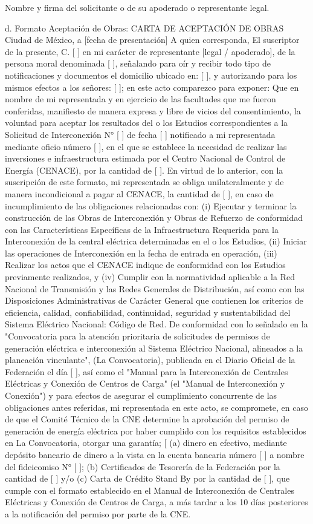  
Nombre y firma del solicitante o de su apoderado o representante legal.\par
d. Formato Aceptación de Obras:
CARTA DE ACEPTACIÓN DE OBRAS
Ciudad de México, a [fecha de presentación]
A quien corresponda,
El suscriptor de la presente, C. [   ] en mi carácter de representante [legal / apoderado], de la persona moral denominada [   ], señalando para oír y recibir todo tipo de notificaciones y documentos el domicilio ubicado en: [   ], y autorizando para los mismos efectos a los señores: [   ]; en este acto comparezco para exponer:
Que en nombre de mi representada y en ejercicio de las facultades que me fueron conferidas, manifiesto de manera expresa y libre de vicios del consentimiento, la voluntad para aceptar los resultados del o los Estudios correspondientes a la Solicitud de Interconexión N° [  ] de fecha [ ] notificado a mi representada mediante oficio número [   ], en el que se establece la necesidad de realizar las inversiones e infraestructura estimada por el Centro Nacional de Control de Energía (CENACE), por la cantidad de [   ].
En virtud de lo anterior, con la suscripción de este formato, mi representada se obliga unilateralmente y de manera incondicional a pagar al CENACE, la cantidad de [  ], en caso de incumplimiento de las obligaciones relacionadas con: (i) Ejecutar y terminar la construcción de las Obras de Interconexión y Obras de Refuerzo de conformidad con las Características Específicas de la Infraestructura Requerida para la Interconexión de la central eléctrica determinadas en el o los Estudios, (ii) Iniciar las operaciones de Interconexión en la fecha de entrada en operación, (iii) Realizar los actos que el CENACE indique de conformidad con los Estudios previamente realizados, y (iv) Cumplir con la normatividad aplicable a la Red Nacional de Transmisión y las Redes Generales de Distribución, así como con las Disposiciones Administrativas de Carácter General que contienen los criterios de eficiencia, calidad, confiabilidad, continuidad, seguridad y sustentabilidad del Sistema Eléctrico Nacional: Código de Red.
De conformidad con lo señalado en la "Convocatoria para la atención prioritaria de solicitudes de permisos de generación eléctrica e interconexión al Sistema Eléctrico Nacional, alineados a la planeación vinculante", (La Convocatoria), publicada en el Diario Oficial de la Federación el día [  ], así como el "Manual para la Interconexión de Centrales Eléctricas y Conexión de Centros de Carga" (el "Manual de Interconexión y Conexión") y para efectos de asegurar el cumplimiento concurrente de las obligaciones antes referidas, mi representada en este acto, se compromete, en caso de que el Comité Técnico de la CNE determine la aprobación del permiso de generación de energía eléctrica por haber cumplido con los requisitos establecidos en La Convocatoria, otorgar una garantía; [ (a) dinero en efectivo, mediante depósito bancario de dinero a la vista en la cuenta bancaria número [  ] a nombre del fideicomiso N° [  ]; (b) Certificados de Tesorería de la Federación por la cantidad de [      ] y/o (c) Carta de Crédito Stand By por la cantidad de [      ], que cumple con el formato establecido en el Manual de Interconexión de Centrales Eléctricas y Conexión de Centros de Carga, a más tardar a los 10 días posteriores a la notificación del permiso por parte de la CNE.
